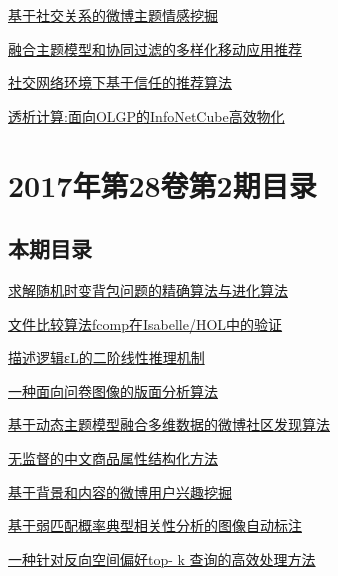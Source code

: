 \documentclass[a4paper]{article}
\begin{document}
\href{http://www.jos.org.cn/ch/reader/create_pdf.aspx?file_no=5157&year_id=2017&quarter_id=3&falg=1}{基于社交关系的微博主题情感挖掘}

\href{http://www.jos.org.cn/ch/reader/create_pdf.aspx?file_no=5163&year_id=2017&quarter_id=3&falg=1}{融合主题模型和协同过滤的多样化移动应用推荐}

\href{http://www.jos.org.cn/ch/reader/create_pdf.aspx?file_no=5159&year_id=2017&quarter_id=3&falg=1}{社交网络环境下基于信任的推荐算法}

\href{http://www.jos.org.cn/ch/reader/create_pdf.aspx?file_no=5170&year_id=2017&quarter_id=3&falg=1}{透析计算:面向OLGP的InfoNetCube高效物化}


\section{\textbf{2017年第28卷第2期目录}}
\subsection{本期目录}
\href{http://www.jos.org.cn/ch/reader/create_pdf.aspx?file_no=4937&year_id=2017&quarter_id=2&falg=1}{求解随机时变背包问题的精确算法与进化算法}

\href{http://www.jos.org.cn/ch/reader/create_pdf.aspx?file_no=5098&year_id=2017&quarter_id=2&falg=1}{文件比较算法fcomp在Isabelle/HOL中的验证}

\href{http://www.jos.org.cn/ch/reader/create_pdf.aspx?file_no=4950&year_id=2017&quarter_id=2&falg=1}{描述逻辑εL的二阶线性推理机制}

\href{http://www.jos.org.cn/ch/reader/create_pdf.aspx?file_no=5032&year_id=2017&quarter_id=2&falg=1}{一种面向问卷图像的版面分析算法}

\href{http://www.jos.org.cn/ch/reader/create_pdf.aspx?file_no=5116&year_id=2017&quarter_id=2&falg=1}{基于动态主题模型融合多维数据的微博社区发现算法}

\href{http://www.jos.org.cn/ch/reader/create_pdf.aspx?file_no=5018&year_id=2017&quarter_id=2&falg=1}{无监督的中文商品属性结构化方法}

\href{http://www.jos.org.cn/ch/reader/create_pdf.aspx?file_no=5030&year_id=2017&quarter_id=2&falg=1}{基于背景和内容的微博用户兴趣挖掘}

\href{http://www.jos.org.cn/ch/reader/create_pdf.aspx?file_no=5047&year_id=2017&quarter_id=2&falg=1}{基于弱匹配概率典型相关性分析的图像自动标注}

\href{http://www.jos.org.cn/ch/reader/create_pdf.aspx?file_no=5050&year_id=2017&quarter_id=2&falg=1}{一种针对反向空间偏好top- k 查询的高效处理方法}
\end{document}

